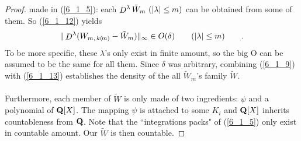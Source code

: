\begin{proof}
made in (\ref{6_1_5}): each $\deriv[\lambda]{\tilde{W}_m}\,\, (\lvert \lambda \rvert\leq m)$ can be obtained from some of them. %
So (\ref{6_1_12}) yields
%
\begin{align}\label{6_1_13}
  \| \deriv[\lambda] (W_{m,\, k(\!m)} - \tilde{W}_m ) \|_\infty \in O(\delta)\qquad (\lvert \lambda \rvert\leq m) \qquad .
\end{align}
%
To be more specific, these $\lambda$'s only exist in finite amount, so the big O can be assumed to be the same for all them. %
Since $\delta$ was arbitrary, combining (\ref{6_1_9}) with (\ref{6_1_13}) establishes the density of the all $\tilde{W}_m$'s %
family $\tilde{W}$. \\
\\
Furthermore, each member of $\tilde{W}$ is only made of two ingredients: $\psi$ and a polynomial of $\mathbf{Q}[X]$. The mapping %
$\psi$ is attached to some $K_i$ and $\mathbf{Q}[X]$ inherits countableness from $\mathbf{Q}$. Note that the ``integrations packs" of %
(\ref{6_1_5}) only exist in countable amount. Our $\tilde{W}$ is then countable.
\end{proof}
% 